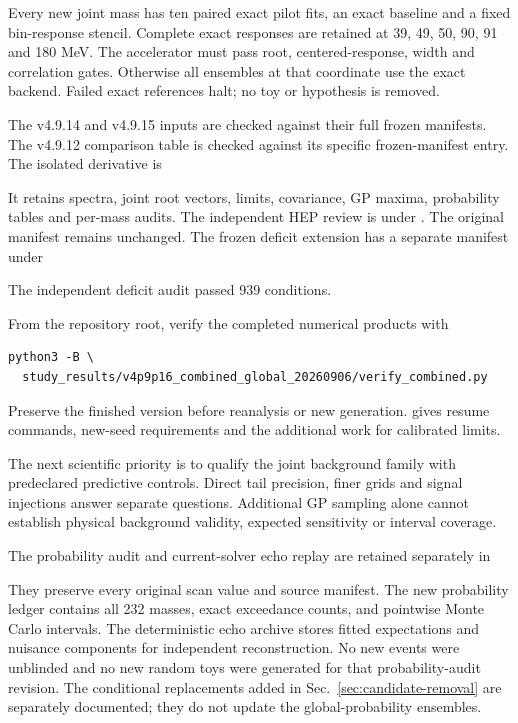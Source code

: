 \documentclass[11pt]{article}
\begin{document}
Every new joint mass has ten paired exact pilot fits, an exact baseline and a fixed bin-response stencil. Complete exact responses are retained at 39, 49, 50, 90, 91 and 180 MeV. The accelerator must pass root, centered-response, width and correlation gates. Otherwise all ensembles at that coordinate use the exact backend. Failed exact references halt; no toy or hypothesis is removed.

The v4.9.14 and v4.9.15 inputs are checked against their full frozen manifests. The v4.9.12 comparison table is checked against its specific frozen-manifest entry. The isolated derivative is
\begin{center}\small{}\end{center}
It retains spectra, joint root vectors, limits, covariance, GP maxima, probability tables and per-mass audits. The independent HEP review is under . The original manifest remains unchanged. The frozen deficit extension has a separate manifest under
\begin{center}\small{}\end{center}
The independent deficit audit passed 939 conditions.

From the repository root, verify the completed numerical products with
\begin{verbatim}
python3 -B \
  study_results/v4p9p16_combined_global_20260906/verify_combined.py
\end{verbatim}
Preserve the finished version before reanalysis or new generation.  gives resume commands, new-seed requirements and the additional work for calibrated limits.

The next scientific priority is to qualify the joint background family with predeclared predictive controls. Direct tail precision, finer grids and signal injections answer separate questions. Additional GP sampling alone cannot establish physical background validity, expected sensitivity or interval coverage.

The probability audit and current-solver echo replay are retained separately in
\begin{center}\small{}\end{center}
They preserve every original scan value and source manifest. The new probability ledger contains all 232 masses, exact exceedance counts, and pointwise Monte Carlo intervals. The deterministic echo archive stores fitted expectations and nuisance components for independent reconstruction. No new events were unblinded and no new random toys were generated for that probability-audit revision. The conditional replacements added in Sec.~\ref{sec:candidate-removal} are separately documented; they do not update the global-probability ensembles.
\end{document}
